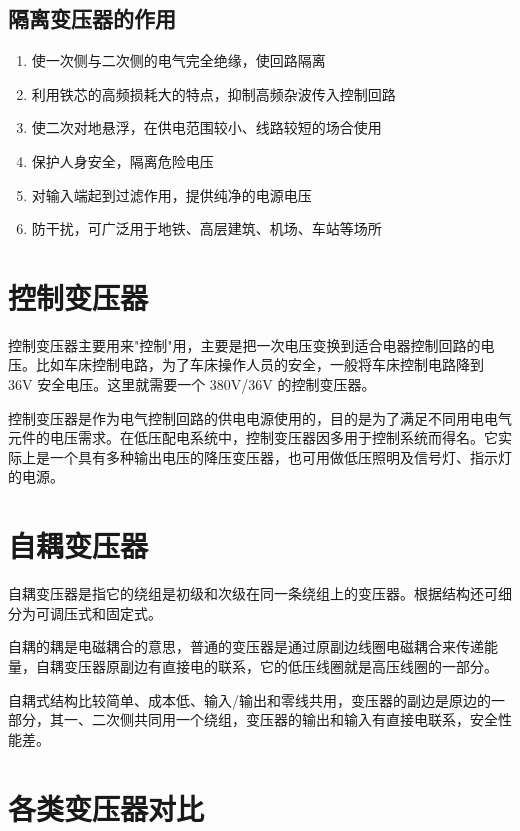 \documentclass[12pt,UTF8]{ctexbook}
\begin{document}
\subsection{隔离变压器的作用}

\begin{enumerate}
    \item 使一次侧与二次侧的电气完全绝缘，使回路隔离
    \item 利用铁芯的高频损耗大的特点，抑制高频杂波传入控制回路
    \item 使二次对地悬浮，在供电范围较小、线路较短的场合使用
    \item 保护人身安全，隔离危险电压
    \item 对输入端起到过滤作用，提供纯净的电源电压
    \item 防干扰，可广泛用于地铁、高层建筑、机场、车站等场所
\end{enumerate}

\section{控制变压器}

控制变压器主要用来"控制"用，主要是把一次电压变换到适合电器控制回路的电压。比如车床控制电路，为了车床操作人员的安全，一般将车床控制电路降到 36V 安全电压。这里就需要一个 380V/36V 的控制变压器。

控制变压器是作为电气控制回路的供电电源使用的，目的是为了满足不同用电电气元件的电压需求。在低压配电系统中，控制变压器因多用于控制系统而得名。它实际上是一个具有多种输出电压的降压变压器，也可用做低压照明及信号灯、指示灯的电源。

\section{自耦变压器}

自耦变压器是指它的绕组是初级和次级在同一条绕组上的变压器。根据结构还可细分为可调压式和固定式。

自耦的耦是电磁耦合的意思，普通的变压器是通过原副边线圈电磁耦合来传递能量，自耦变压器原副边有直接电的联系，它的低压线圈就是高压线圈的一部分。

自耦式结构比较简单、成本低、输入/输出和零线共用，变压器的副边是原边的一部分，其一、二次侧共同用一个绕组，变压器的输出和输入有直接电联系，安全性能差。

\section{各类变压器对比}
\end{document}
